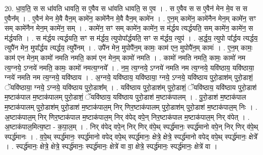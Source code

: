 \documentclass[17pt]{extarticle}
\begin{document}
20. धा॒व॒ति॒ स स धा॑वति धावति॒ स ए॒वैव स धा॑वति धावति॒ स ए॒व । . स ए॒वैव स स ए॒वैन॑ मेन मे॒व स स ए॒वैन᳚म् । . ए॒वैन॑ मेन मे॒वै वैन॒म् कामे॑न॒ कामे॑नैन मे॒वै वैन॒म् कामे॑न । . ए॒न॒म् कामे॑न॒ कामे॑नैन मेन॒म् कामे॑न॒ सꣳ सम् कामे॑नैन मेन॒म् कामे॑न॒ सम् । . कामे॑न॒ सꣳ सम् कामे॑न॒ कामे॑न॒ स म॑र्द्धय त्यर्द्धयति॒ सम् कामे॑न॒ कामे॑न॒ स म॑र्द्धयति । . स म॑र्द्धय त्यर्द्धयति॒ सꣳ स म॑र्द्धय॒ त्युपोपा᳚र्द्धयति॒ सꣳ स म॑र्द्धय॒ त्युप॑ । . अ॒र्द्ध॒य॒ त्युपो पा᳚र्द्धय त्यर्द्धय॒ त्युपै॑न मेन॒ मुपा᳚र्द्धय त्यर्द्धय॒ त्युपै॑नम् । . उपै॑न मेन॒ मुपोपै॑न॒म् कामः॒ काम॑ एन॒ मुपोपै॑न॒म् कामः॑ । . ए॒न॒म् कामः॒ काम॑ एन मेन॒म् कामो॑ नमति नमति॒ काम॑ एन मेन॒म् कामो॑ नमति । . कामो॑ नमति नमति॒ कामः॒ कामो॑ नम त्य॒ग्नये॒ ऽग्नये॑ नमति॒ कामः॒ कामो॑ नमत्य॒ग्नये᳚ । . न॒म॒ त्य॒ग्नये॒ ऽग्नये॑ नमति नम त्य॒ग्नये॒ यवि॑ष्ठाय॒ यवि॑ष्ठाया॒ ग्नये॑ नमति नम त्य॒ग्नये॒ यवि॑ष्ठाय । . अ॒ग्नये॒ यवि॑ष्ठाय॒ यवि॑ष्ठाया॒ ग्नये॒ ऽग्नये॒ यवि॑ष्ठाय पुरो॒डाश॑म् पुरो॒डाशं॒ ॅयवि॑ष्ठाया॒ ग्नये॒ ऽग्नये॒ यवि॑ष्ठाय पुरो॒डाश᳚म् । . यवि॑ष्ठाय पुरो॒डाश॑म् पुरो॒डाशं॒ ॅयवि॑ष्ठाय॒ यवि॑ष्ठाय पुरो॒डाश॑ म॒ष्टाक॑पाल म॒ष्टाक॑पालम् पुरो॒डाशं॒ ॅयवि॑ष्ठाय॒ यवि॑ष्ठाय पुरो॒डाश॑ म॒ष्टाक॑पालम् । . पु॒रो॒डाश॑ म॒ष्टाक॑पाल म॒ष्टाक॑पालम् पुरो॒डाश॑म् पुरो॒डाश॑ म॒ष्टाक॑पाल॒म् निर् णिर॒ष्टाक॑पालम् पुरो॒डाश॑म् पुरो॒डाश॑ म॒ष्टाक॑पाल॒म् निः । . अ॒ष्टाक॑पाल॒म् निर् णिर॒ष्टाक॑पाल म॒ष्टाक॑पाल॒म् निर् व॑पेद् वपे॒न् निर॒ष्टाक॑पाल म॒ष्टाक॑पाल॒म् निर् व॑पेत् । . अ॒ष्टाक॑पाल॒मित्य॒ष्टा - क॒पा॒ल॒म् । . निर् व॑पेद् वपे॒न् निर् णिर् व॑पे॒थ् स्पर्द्ध॑मानः॒ स्पर्द्ध॑मानो वपे॒न् निर् णिर् व॑पे॒थ् स्पर्द्ध॑मानः । . व॒पे॒थ् स्पर्द्ध॑मानः॒ स्पर्द्ध॑मानो वपेद् वपे॒थ् स्पर्द्ध॑मानः॒ क्षेत्रे॒ क्षेत्रे॒ स्पर्द्ध॑मानो वपेद् वपे॒थ् स्पर्द्ध॑मानः॒ क्षेत्रे᳚ । . स्पर्द्ध॑मानः॒ क्षेत्रे॒ क्षेत्रे॒ स्पर्द्ध॑मानः॒ स्पर्द्ध॑मानः॒ क्षेत्रे॑ वा वा॒ क्षेत्रे॒ स्पर्द्ध॑मानः॒ स्पर्द्ध॑मानः॒ क्षेत्रे॑ वा । \newline
\end{document}
